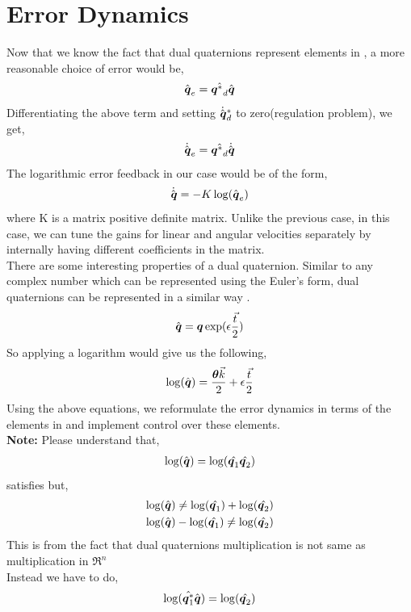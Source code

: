 \documentclass[a4paper,12pt]{article}
\begin{document}
\section{Error Dynamics}
Now that we know the fact that dual quaternions represent elements in \SE, a more reasonable choice of error would be, 
\begin{align}
	\hat{\boldsymbol{q}}_e = \hat{{\boldsymbol{q}^*}_d} \hat{\boldsymbol{q}}
\end{align}
Differentiating the above term and setting $\dot{\hat{\boldsymbol{q}}}^*_d$ to zero(regulation problem), we get,
\begin{align}
	\dot{\hat{\boldsymbol{q}}}_e = \hat{{\boldsymbol{q}^*}_d} \dot{\hat{\boldsymbol{q}}}
\end{align}
The logarithmic error feedback in our case would be of the form,
\begin{align}
	\dot{\hat{\boldsymbol{q}}} = -K \log(\hat{\boldsymbol{q}}_e)
\end{align}
where K is a matrix positive definite matrix. Unlike the previous case, in this case, we can tune the gains for linear and angular velocities separately by internally having different coefficients in the matrix.\\
There are some interesting properties of a dual quaternion. Similar to any complex number which can be represented using the Euler's form, dual quaternions can be represented in a similar way \cite{bottema1979theoretical}.
\begin{align}
	\hat{\boldsymbol{q}} = \boldsymbol{q} \exp(\epsilon \frac{\vec{t}}{2})
\end{align}
So applying a logarithm would give us the following, 
\begin{align}
	\log(\hat{\boldsymbol{q}}) = \frac{\boldsymbol{\theta} \vec{k}}{2} + \epsilon \frac{\vec{t}}{2}
\end{align}
Using the above equations, we reformulate the error dynamics in terms of the elements in \se and implement control over these elements.\\
{\bf Note:} Please understand that,
\begin{align}
	\log(\hat{\boldsymbol{q}}) = \log(\hat{\boldsymbol{q}_1}\hat{\boldsymbol{q}_2})
\end{align}
satisfies but, 
\begin{align}
	\log(\hat{\boldsymbol{q}}) \neq \log(\hat{\boldsymbol{q}_1})+\log(\hat{\boldsymbol{q}_2})\\
	\log(\hat{\boldsymbol{q}})-\log(\hat{\boldsymbol{q}_1}) \neq \log(\hat{\boldsymbol{q}_2})
\end{align}
This is from the fact that dual quaternions multiplication is not same as multiplication in $\Re^n$\\
Instead we have to do, 
\begin{align}
	\log(\hat{\boldsymbol{q}^*_1} \hat{\boldsymbol{q}}) = \log(\hat{\boldsymbol{q}_2})
\end{align}
\end{document}
